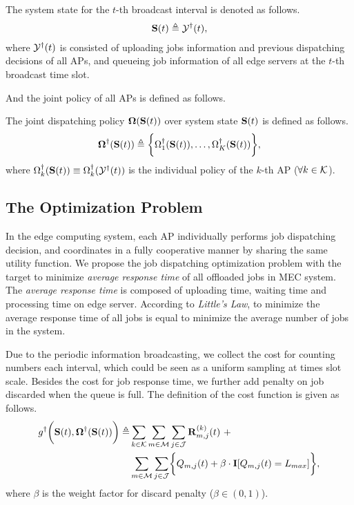 \begin{definition}
    The system state for the $t$-th broadcast interval is denoted as follows.
    \begin{align}
        \mathbf{S}(t) \triangleq \mathcal{Y}^{\dagger}(t),
    \end{align}
    where $\mathcal{Y}^{\dagger}(t)$ is consisted of uploading jobs information and previous dispatching decisions of all APs, and queueing job information of all edge servers at the $t$-th broadcast time slot.
\end{definition}

And the joint policy of all APs is defined as follows.
\begin{definition}
    The joint dispatching policy $\boldsymbol{\Omega}(\mathbf{S}(t))$ over system state $\mathbf{S}(t)$ is defined as follows.
    \begin{align}
        \boldsymbol{\Omega}^{\dagger}(\mathbf{S}(t)) \triangleq \bigg\{
            \Omega^{\dagger}_{1}(\mathbf{S}(t)), \dots, \Omega^{\dagger}_{K}(\mathbf{S}(t))
        \bigg\},
    \end{align}
    where $\Omega^{\dagger}_{k}(\mathbf{S}(t)) \equiv \Omega^{\dagger}_{k}(\mathcal{Y}^{\dagger}(t))$
    is the individual policy of the $k$-th AP ($\forall k\in\mathcal{K}$).
\end{definition}

\subsection{The Optimization Problem}
In the edge computing system, each AP individually performs job dispatching decision, and coordinates in a fully cooperative manner by sharing the same utility function.
We propose the job dispatching optimization problem with the target to minimize \emph{average response time} of all offloaded jobs in MEC system.
The \emph{average response time} is composed of uploading time, waiting time and processing time on edge server.
According to \emph{Little's Law}, to minimize the average response time of all jobs is equal to minimize the average number of jobs in the system.

Due to the periodic information broadcasting, we collect the cost for counting numbers each interval, which could be seen as a uniform sampling at times slot scale.
Besides the cost for job response time, we further add penalty on job discarded when the queue is full.
The definition of the cost function is given as follows.
\begin{align}
    g^{\dagger}\Paren{\Stat(t), \Policy^{\dagger}(\Stat(t))} \define
        &\sum_{k\in\apSet} \sum_{m\in\esSet} \sum_{j\in\jSpace} \vec{R}^{(k)}_{m,j}(t)~+
        \nonumber\\
        &\sum_{m\in\esSet} \sum_{j\in\jSpace} \Brace{Q_{m,j}(t) + \beta \cdot \mat{I}[Q_{m,j}(t)=L_{max}]},
\end{align}
where $\beta$ is the weight factor for discard penalty ($\beta \in (0,1)$).

